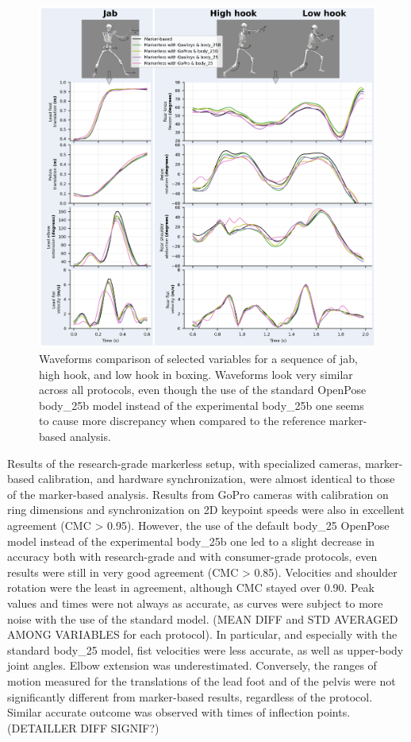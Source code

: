 \begin{figure}[!ht]
	\centering
	\def\svgwidth{1\columnwidth}
	\fontsize{10pt}{10pt}\selectfont
	\includegraphics[width=\linewidth]{"../Chap6/Figures/Fig_GraphKPI.png"}
	\caption{Waveforms comparison of selected variables for a sequence of jab, high hook, and low hook in boxing. Waveforms look very similar across all protocols, even though the use of the standard OpenPose body\_25b model instead of the experimental body\_25b one seems to cause more discrepancy when compared to the reference marker-based analysis.}
	\label{fig_graphkpi}
\end{figure}

\clearpage
Results of the research-grade markerless setup, with specialized cameras, marker-based calibration, and hardware synchronization, were almost identical to those of the marker-based analysis. Results from GoPro cameras with calibration on ring dimensions and synchronization on 2D keypoint speeds were also in excellent agreement (CMC > 0.95). However, the use of the default body\_25 OpenPose model instead of the experimental body\_25b one led to a slight decrease in accuracy both with research-grade and with consumer-grade protocols, even results were still in very good agreement (CMC > 0.85). Velocities and shoulder rotation were the least in agreement, although CMC stayed over 0.90. Peak values and times were not always as accurate, as curves were subject to more noise with the use of the standard model. (MEAN DIFF and STD AVERAGED AMONG VARIABLES for each protocol). In particular, and especially with the standard body\_25 model, fist velocities were less accurate, as well as upper-body joint angles. Elbow extension was underestimated. Conversely, the ranges of motion measured for the translations of the lead foot and of the pelvis were not significantly different from marker-based results, regardless of the protocol. Similar accurate outcome was observed with times of inflection points. (DETAILLER DIFF SIGNIF?)

